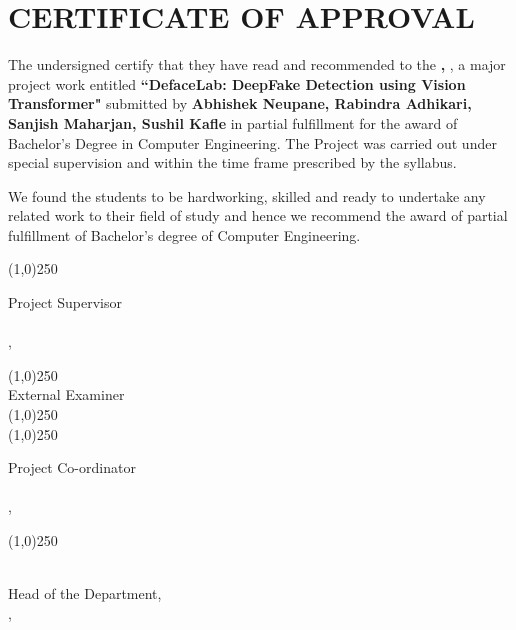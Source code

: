 \section*{CERTIFICATE OF APPROVAL}
\begingroup
\setlength{\parskip}{0pt}

The undersigned certify that they have read and recommended to the \textbf{\thedepartment,  \thecampus}, a major
project work entitled \textbf{“DefaceLab:  DeepFake Detection using Vision Transformer"} submitted by \textbf{Abhishek Neupane, Rabindra Adhikari, Sanjish Maharjan, Sushil Kafle} in partial fulfillment for the award of Bachelor’s
Degree in Computer Engineering. The Project was carried out
under special supervision and within the time frame prescribed by the syllabus.

\vspace{0.3cm}

\noindent We found the students to be hardworking, skilled and ready to undertake any related
work to their field of study and hence we recommend the award of partial fulfillment
of Bachelor’s degree of Computer Engineering.

\vspace{0.5cm}

\noindent \line(1,0){250}

\noindent Project Supervisor \\
\thesupervisor \\
\thedepartment, \thecampus


\vspace{0.4cm}
\noindent \line(1,0){250}\\
\noindent External Examiner \\

\noindent \line(1,0){250}\\


\noindent \line(1,0){250}

\noindent Project Co-ordinator \\
\theprogramcoordinator \\
\thedepartment, \thecampus

\vspace{0.4cm}

\noindent \line(1,0){250}

\noindent \theHOD \\
Head of the Department, \\
\thedepartment, \thecampus

\vspace{0.3cm}

\noindent \thedate
\endgroup